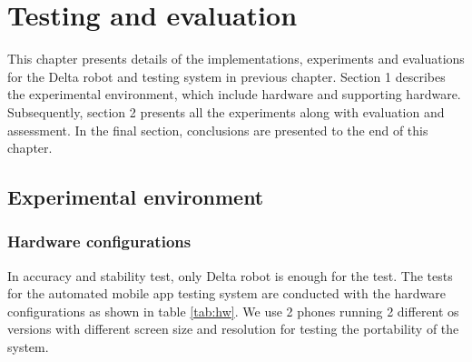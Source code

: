 \chapter{Testing and evaluation}

This chapter presents details of the implementations, experiments and evaluations for the Delta robot and testing system in previous chapter. Section 1 describes the experimental environment, which include hardware and supporting hardware. Subsequently, section 2 presents all the experiments along with evaluation and assessment. In the final section, conclusions are presented to the end of this chapter.

\section{Experimental environment}
\subsection{Hardware configurations}
In accuracy and stability test, only Delta robot is enough for the test. The tests for the automated mobile app testing system are conducted with the hardware configurations as shown in table \ref{tab:hw}. We use 2 phones running 2 different \acrshort{os} versions with different screen size and resolution for testing the portability of the system.

